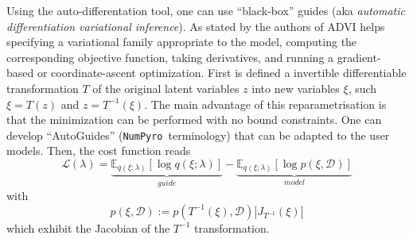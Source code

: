 \documentclass[twocolumn,twocolappendix,nofootinbib,iop]{openjournal}
\newcommand{\numpyro}{\texttt{NumPyro}}
\newcommand{\bydef}{:=}
\begin{document}
Using the auto-differentation tool, one can use ``black-box'' guides (aka \textit{automatic differentiation variational inference}). As stated by the authors of \citep{10.5555/3122009.3122023} ADVI helps specifying a variational family appropriate to the model, computing the corresponding objective
function, taking derivatives, and running a gradient-based or coordinate-ascent optimization. First is defined a invertible differentiable transformation $T$ of the original latent variables $z$ into new variables $\xi$, such $\xi=T(z)$ and $z=T^{-1}(\xi)$. The main advantage of this reparametrisation is that the minimization can be performed with no bound constraints. One can develop ``AutoGuides'' (\numpyro\ terminology) that can be adapted to the user models. Then, the cost function reads
\begin{equation}
\mathcal{L}(\lambda) = \underbrace{\mathbb{E}_{q(\xi;\lambda)}\left[ \log q(\xi;\lambda)\right]}_{guide} - \underbrace{\mathbb{E}_{q(\xi;\lambda)}\left[ \log p(\xi,\mathcal{D}) \right]}_{model}
\label{eq-loss-svi-2}
\end{equation}
with
\begin{equation}
p(\xi,\mathcal{D}) \bydef p(T^{-1}(\xi),\mathcal{D}) |J_{T^{-1}}(\xi)|
\end{equation}
which exhibit the Jacobian of the $T^{-1}$ transformation.
\end{document}
